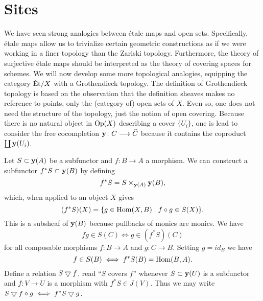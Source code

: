 \section{Sites}
We have seen strong analogies between \'etale maps and open sets. Specifically, \'etale maps allow us to trivialize certain geometric constructions as if we were working in a finer topology than the Zariski topology. Furthermore, the theory of surjective \'etale maps should be interpreted as the theory of covering spaces for schemes. We will now develop some more topological analogies, equipping the category $\text{\'Et}/X$ with a Grothendieck topology. The definition of Grothendieck topology is based on the observation that the definition sheaves makes no reference to points, only the (category of) open sets of $X$. Even so, one does not need the structure of the topology, just the notion of open covering. Because there is no natural object in $\operatorname{Op}(X)$ describing a cover $\{U_i\}$, one is lead to consider the free cocompletion $\mathbf{y} \colon C \longrightarrow \widehat{C}$ because it contains the coproduct $\coprod \mathbf{y}(U_i)$.

Let $S \subset \mathbf{y}(A)$ be a subfunctor and $f \colon B \to A$ a morphism. We can construct a subfunctor $f^*S \subset \mathbf{y}(B)$ by defining
\[
	f^*S = S \times_{\mathbf{y}(A)} \mathbf{y}(B),
\]
which, when applied to an object $X$ gives
\[
	(f^*S)(X) = \{g \in \operatorname{Hom}(X,B) \mid f \circ g \in S(X)\}.
\]
This is a subsheaf of $\mathbf{y}(B)$ because pullbacks of monics are monics. We have
\[
	fg \in S(C) \iff g \in (f^*S)(C)
\]
for all composable morphisms $f \colon  B \to A$ and $g \colon C \to B$. Setting $g = id_B$ we have
\[
	f \in S(B) \iff f^*S(B) = \operatorname{Hom}(B,A).
\]
Define a relation $S \bigtriangledown f$, read ``$S$ covers $f$'' whenever $S \subset \mathbf{y}(U)$ is a subfunctor and $f \colon V \to U$ is a morphism with $f^*S \in J(V)$. Thus we may write $S \bigtriangledown f \circ g \iff f^*S \bigtriangledown g$.

